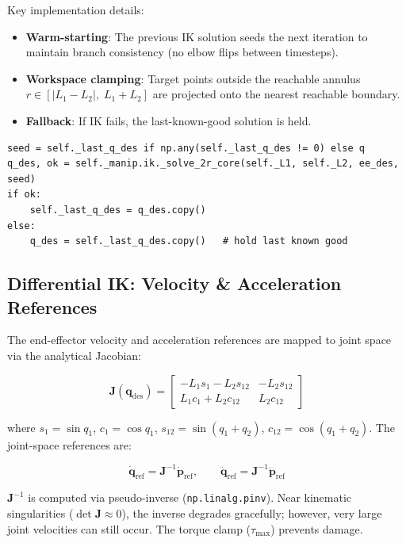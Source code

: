 \documentclass[11pt,a4paper]{article}
\newcommand{\bq}{\bm{q}}
\newcommand{\bJ}{\bm{J}}
\begin{document}
Key implementation details:
\begin{itemize}[leftmargin=2em]
    \item \textbf{Warm-starting}: The previous IK solution seeds the next iteration to maintain branch consistency (no elbow flips between timesteps).
    \item \textbf{Workspace clamping}: Target points outside the reachable annulus $r \in [|L_1 - L_2|,\; L_1 + L_2]$ are projected onto the nearest reachable boundary.
    \item \textbf{Fallback}: If IK fails, the last-known-good solution is held.
\end{itemize}

\begin{lstlisting}[caption={IK warm-start in ComputedTorqueController.\_solve().}]
seed = self._last_q_des if np.any(self._last_q_des != 0) else q
q_des, ok = self._manip.ik._solve_2r_core(self._L1, self._L2, ee_des, seed)
if ok:
    self._last_q_des = q_des.copy()
else:
    q_des = self._last_q_des.copy()   # hold last known good
\end{lstlisting}


\subsection{Differential IK: Velocity \& Acceleration References}

The end-effector velocity and acceleration references are mapped to joint space via the analytical Jacobian:

\begin{equation}
    \bJ(\bq_{\mathrm{des}}) = \begin{bmatrix}
        -L_1 s_1 - L_2 s_{12} & -L_2 s_{12} \\[2pt]
        L_1 c_1 + L_2 c_{12}  &  L_2 c_{12}
    \end{bmatrix}
\label{eq:jacobian}
\end{equation}

where $s_1 = \sin q_1$, $c_1 = \cos q_1$, $s_{12} = \sin(q_1 + q_2)$, $c_{12} = \cos(q_1 + q_2)$.  The joint-space references are:

\begin{equation}
\boxed{
    \dot{\bq}_{\mathrm{ref}} = \bJ^{-1} \dot{\bm{p}}_{\mathrm{ref}}, \qquad
    \ddot{\bq}_{\mathrm{ref}} = \bJ^{-1} \ddot{\bm{p}}_{\mathrm{ref}}
}
\label{eq:diff_ik}
\end{equation}

\begin{warnbox}
$\bJ^{-1}$ is computed via pseudo-inverse (\texttt{np.linalg.pinv}).  Near kinematic singularities ($\det \bJ \approx 0$), the inverse degrades gracefully; however, very large joint velocities can still occur.  The torque clamp ($\tau_{\max}$) prevents damage.
\end{warnbox}
\end{document}
